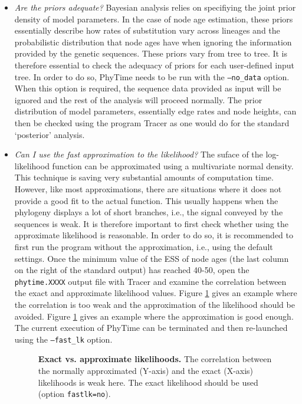 \documentclass[a4paper,12pt]{article}
\newcommand{\x}[1]{\texttt{#1}}
\begin{document}
\begin{itemize} 
\item {\em  Are the priors adequate?} Bayesian  analysis relies on  specifiying the joint
prior density  of model parameters.  In  the case of  node age estimation, these  priors essentially
describe how rates of substitution vary across lineages and the probabilistic distribution that node
ages have when  ignoring the information provided  by the genetic sequences. These  priors vary from
tree to tree. It is therefore essential to  check the adequacy of priors for each user-defined input
tree. In order to do so, PhyTime needs to be run with the \x{--no\_data} option. When this option is
required, the  sequence data provided  as input will  be ignored and the  rest of the  analysis will
proceed  normally. The  prior distribution  of  model parameters,  essentially edge  rates and  node
heights, can then be  checked using the program Tracer as one would  do for the standard `posterior'
analysis.

\item {\em  Can I use the  fast approximation to the  likelihood?} The suface  of the log-likelihood
function can  be approximated using  a multivariate normal  density.  This technique is  saving very
substantial amounts  of computation  time. However, like  most approximations, there  are situations
where it does not provide a good fit to the actual function. This usually happens when the phylogeny
displays  a lot  of short  branches, i.e.,  the  signal conveyed  by the  sequences is  weak. It  is
therefore important to first check whether  using the approximate likelihood is reasonable. In order
to do  so, it is  recommended to first  run the program without  the approximation, i.e.,  using the
default settings. Once  the minimum value of the ESS  of node ages (the last column  on the right of
the  standard output)  has reached  40-50, open  the \x{phytime.XXXX}  output file  with  Tracer and
examine   the  correlation   between  the   exact   and  approximate   likelihood  values.    Figure
\ref{fig:approxbad} gives an example where the correlation  is too weak and the approximation of the
likelihood should be avoided. Figure \ref{fig:approxbad} gives an example where the approximation is
good enough.   The current execution  of PhyTime  can be terminated  and then re-launched  using the
\x{--fast\_lk} option.

\begin{figure}
\begin{center}
\caption{{\bf Exact vs. approximate likelihoods.} The correlation between the normally approximated
  (Y-axis) and the exact (X-axis) likelihoods is weak here. The exact likelihood should be used (option \x{fastlk=no}).}
\label{fig:approxbad}
\end{center}
\end{figure}



\end{itemize}
\end{document}
